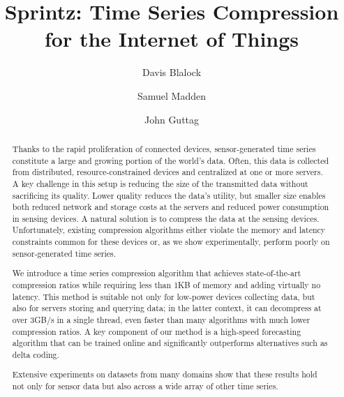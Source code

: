 \documentclass[acmlarge]{acmart}
\begin{document}
\title{Sprintz: Time Series Compression for the Internet of Things}


\author{Davis Blalock}

\author{Samuel Madden}

\author{John Guttag}

\begin{abstract}

Thanks to the rapid proliferation of connected devices, sensor-generated time series constitute a large and growing portion of the world's data. Often, this data is collected from distributed, resource-constrained devices and centralized at one or more servers. A key challenge in this setup is reducing the size of the transmitted data without sacrificing its quality. Lower quality reduces the data's utility, but smaller size enables both reduced network and storage costs at the servers and reduced power consumption in sensing devices. A natural solution is to compress the data at the sensing devices. Unfortunately, existing compression algorithms either violate the memory and latency constraints common for these devices or, as we show experimentally, perform poorly on sensor-generated time series.

We introduce a time series compression algorithm that achieves state-of-the-art compression ratios while requiring less than 1KB of memory and adding virtually no latency. This method is suitable not only for low-power devices collecting data, but also for servers storing and querying data; in the latter context, it can decompress at over 3GB/s in a single thread, even faster than many algorithms with much lower compression ratios. A key component of our method is a high-speed forecasting algorithm that can be trained online and significantly outperforms alternatives such as delta coding.

Extensive experiments on datasets from many domains show that these results hold not only for sensor data but also across a wide array of other time series.

\end{abstract}
\end{document}
